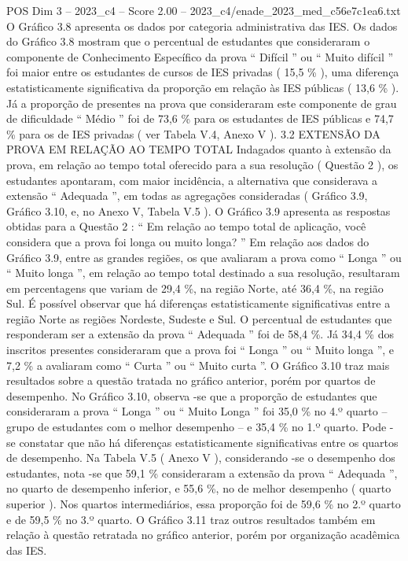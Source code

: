 \begin{textsample}{POS Dim 3 – 2023\_c4 – Score 2.00 – 2023\_c4/enade\_2023\_med\_c56e7c1ea6.txt}
O Gráfico 3.8 apresenta os dados por categoria administrativa das IES.
Os dados do Gráfico 3.8 mostram que o percentual de estudantes que consideraram o componente de Conhecimento Específico da prova “ Difícil ” ou “ Muito difícil ” foi maior entre os estudantes de cursos de IES privadas ( 15,5 \% ), uma diferença estatisticamente significativa da proporção em relação às IES públicas ( 13,6 \% ).
Já a proporção de presentes na prova que consideraram este componente de grau de dificuldade “ Médio ” foi de 73,6 \% para os estudantes de IES públicas e 74,7 \% para os de IES privadas ( ver Tabela V.4, Anexo V ). 3.2 EXTENSÃO DA PROVA EM RELAÇÃO AO TEMPO TOTAL Indagados quanto à extensão da prova, em relação ao tempo total oferecido para a sua resolução ( Questão 2 ), os estudantes apontaram, com maior incidência, a alternativa que considerava a extensão “ Adequada ”, em todas as agregações consideradas ( Gráfico 3.9, Gráfico 3.10, e, no Anexo V, Tabela V.5 ).
O Gráfico 3.9 apresenta as respostas obtidas para a Questão 2 : “ Em relação ao tempo total de aplicação, você considera que a prova foi longa ou muito longa? ” Em relação aos dados do Gráfico 3.9, entre as grandes regiões, os que avaliaram a prova como “ Longa ” ou “ Muito longa ”, em relação ao tempo total destinado a sua resolução, resultaram em percentagens que variam de 29,4 \%, na região Norte, até 36,4 \%, na região Sul.
É possível observar que há diferenças estatisticamente significativas entre a região Norte as regiões Nordeste, Sudeste e Sul.
O percentual de estudantes que responderam ser a extensão da prova “ Adequada ” foi de 58,4 \%.
Já 34,4 \% dos inscritos presentes consideraram que a prova foi “ Longa ” ou “ Muito longa ”, e 7,2 \% a avaliaram como “ Curta ” ou “ Muito curta ”.
O Gráfico 3.10 traz mais resultados sobre a questão tratada no gráfico anterior, porém por quartos de desempenho.
No Gráfico 3.10, observa -se que a proporção de estudantes que consideraram a prova “ Longa ” ou “ Muito Longa ” foi 35,0 \% no 4.º quarto – grupo de estudantes com o melhor desempenho – e 35,4 \% no 1.º quarto.
Pode -se constatar que não há diferenças estatisticamente significativas entre os quartos de desempenho.
Na Tabela V.5 ( Anexo V ), considerando -se o desempenho dos estudantes, nota -se que 59,1 \% consideraram a extensão da prova “ Adequada ”, no quarto de desempenho inferior, e 55,6 \%, no de melhor desempenho ( quarto superior ).
Nos quartos intermediários, essa proporção foi de 59,6 \% no 2.º quarto e de 59,5 \% no 3.º quarto.
O Gráfico 3.11 traz outros resultados também em relação à questão retratada no gráfico anterior, porém por organização acadêmica das IES.

\end{textsample}
